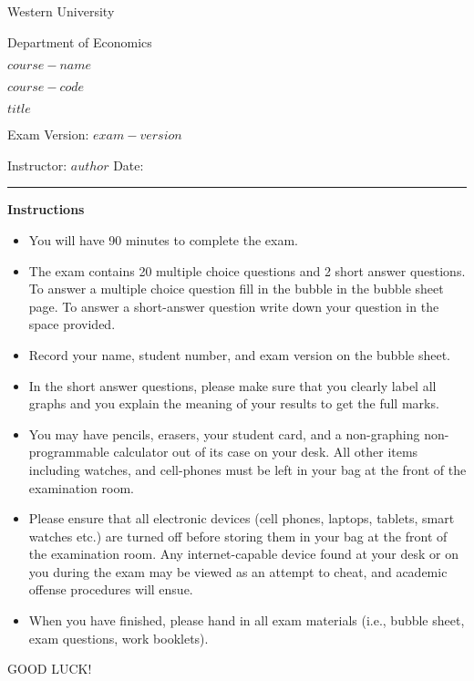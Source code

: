 \begin{titlepage}
    \centering
    {\LARGE Western University\par}
    {\Large Department of Economics\par}
    \vspace{1cm}
    {\large $course-name$ \par
    $course-code$ \par
    $title$ \par
    Exam Version: $exam-version$ \par}
    \vspace{1cm}
    Instructor: $author$ \hfill Date:\enspace\rule{4cm}{0.4pt}\par
    \vspace{1cm}
    \raggedleft
    \vfill
    {\centering 
        {\bf Instructions \par}
    }
    \raggedleft
    \begin{itemize}
        \item You will have 90 minutes to complete the exam.
        \item The exam contains 20 multiple choice questions and 2 short answer questions. To answer a multiple choice question fill in the bubble in the bubble sheet page. To answer a short-answer question write down your question in the space provided.
        \item Record your name, student number, and exam version on the bubble sheet.
        \item In the short answer questions, please make sure that you clearly label all graphs and you explain the meaning of your results to get the full marks.
        \item You may have pencils, erasers, your student card, and a non-graphing non-programmable calculator out of its case on your desk. All other items including watches, and cell-phones must be left in your bag at the front of the examination room.
        \item Please ensure that all electronic devices (cell phones, laptops, tablets, smart watches etc.) are turned off before storing them in your bag at the front of the examination room.  Any internet-capable device found at your desk or on you during the exam may be viewed as an attempt to cheat, and academic offense procedures will ensue.
        \item When you have finished, please hand in all exam materials (i.e., bubble sheet, exam questions, work booklets).
    \end{itemize}
    \centering GOOD LUCK!
\end{titlepage}
\newpage

